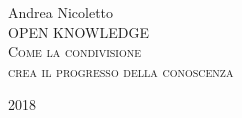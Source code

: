 \documentclass[11pt,a4paper,oneside]{memoir}
\newcommand*{\titleAM}{
\begingroup
	\centering
	{\large Andrea Nicoletto}\\[4\baselineskip]
	{\HUGE OPEN KNOWLEDGE}\\[2\baselineskip]
	{\large\scshape Come la condivisione}\\
	{\large\scshape crea il progresso della conoscenza}\\[2\baselineskip]
	\par{\small\scshape 2018}\par
	\vfill
	\null
\endgroup}
\begin{document}
\begin{titlingpage}
\titleAM
\end{titlingpage}









\printbibliography
\end{document}
